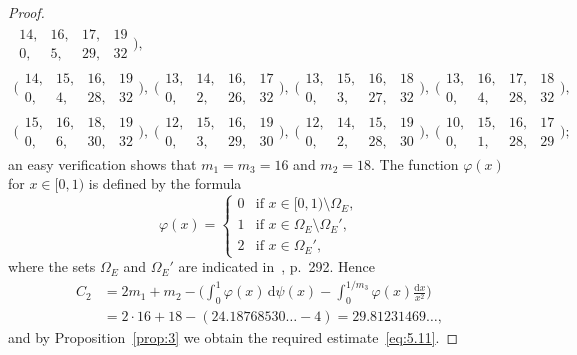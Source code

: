 \documentclass[a4paper,twoside]{article}
\numberwithin{equation}{section}
\renewcommand{\[}{\lfloor}
\renewcommand{\]}{\rfloor}
\newcommand{\<}{\langle}
\renewcommand{\>}{\rangle}
\renewcommand{\phi}{\varphi}
\renewcommand{\d}{\mathrm{d}}
\begin{document}
\begin{proof}
\begin{gather*}
\begin{array}{rrrr}
14, & 16, & 17, & 19 \\ 0, & 5, & 29, & 32
\end{array}\biggr),
\\
\biggl(\begin{array}{rrrr}
14, & 15, & 16, & 19 \\ 0, & 4, & 28, & 32
\end{array}\biggr),
\;
\biggl(\begin{array}{rrrr}
13, & 14, & 16, & 17 \\ 0, & 2, & 26, & 32
\end{array}\biggr),
\;
\biggl(\begin{array}{rrrr}
13, & 15, & 16, & 18 \\ 0, & 3, & 27, & 32
\end{array}\biggr),
\;
\biggl(\begin{array}{rrrr}
13, & 16, & 17, & 18 \\ 0, & 4, & 28, & 32
\end{array}\biggr),
\\
\biggl(\begin{array}{rrrr}
15, & 16, & 18, & 19 \\ 0, & 6, & 30, & 32
\end{array}\biggr),
\;
\biggl(\begin{array}{rrrr}
12, & 15, & 16, & 19 \\ 0, & 3, & 29, & 30
\end{array}\biggr),
\;
\biggl(\begin{array}{rrrr}
12, & 14, & 15, & 19 \\ 0, & 2, & 28, & 30
\end{array}\biggr),
\;
\biggl(\begin{array}{rrrr}
10, & 15, & 16, & 17 \\ 0, & 1, & 28, & 29
\end{array}\biggr);
\end{gather*}
an easy verification shows that $m_1=m_3=16$ and $m_2=18$. The function
$\phi(x)$ for $x\in[0,1)$ is defined by the formula
$$
\phi(x)=\begin{cases}
0 & \mbox{if $x\in[0,1)\setminus\varOmega_E$}, \\
1 & \mbox{if $x\in\varOmega_E\setminus\varOmega_E'$}, \\
2 & \mbox{if $x\in\varOmega_E'$},
\end{cases}
$$
where the sets $\varOmega_E$ and $\varOmega_E'$ are indicated
in~\cite{RV3}, p.~292. Hence
\begin{align*}
C_2
&=2m_1+m_2
-\biggl(\int_0^1\phi(x)\,\d\psi(x)
-\int_0^{1/m_3}\phi(x)\frac{\d x}{x^2}\biggr)
\\
&=2\cdot16+18-(24.18768530\hdots-4)
=29.81231469\dots,
\end{align*}
and by Proposition~\ref{prop:3}
we obtain the required estimate~\eqref{eq:5.11}.
\end{proof}
\end{document}
